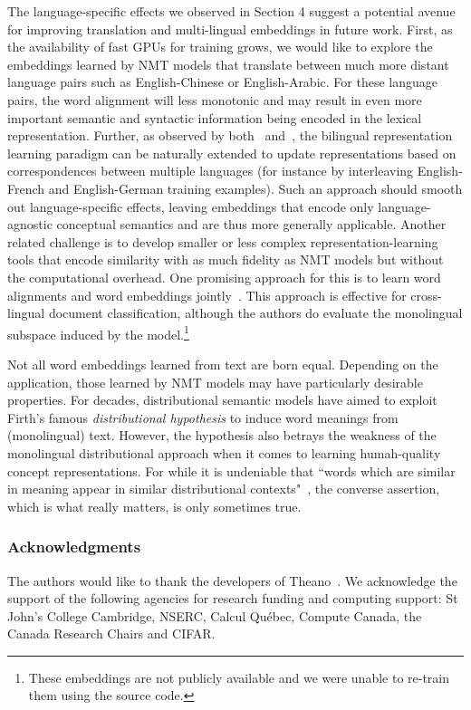 \documentclass{article} %
\begin{document}
The language-specific effects we observed in Section 4 suggest a potential avenue for improving translation and multi-lingual embeddings in future work. First, as the availability of fast GPUs for training grows, we would like to explore the embeddings learned by NMT models that translate between much more distant language pairs such as English-Chinese or English-Arabic. For these language pairs, the word alignment will less monotonic and may result in even more important semantic and syntactic information being encoded in the lexical representation. Further,  as observed by both~\cite{Hermann:2014:ICLR} and~\cite{faruqui2014improving}, the bilingual representation learning paradigm can be naturally extended to update representations based on correspondences between multiple languages (for instance by interleaving English-French and English-German training examples). Such an approach should smooth out language-specific effects, leaving embeddings that encode only language-agnostic conceptual semantics and are thus more generally applicable. Another related challenge is to develop smaller or less complex representation-learning tools that encode similarity with as much fidelity as NMT models but without the computational overhead. One promising approach for this is to learn word alignments and word embeddings jointly~\citep{Kocisky:2014}. This approach is effective for cross-lingual document classification, although the authors do evaluate the monolingual subspace induced by the model.\footnote{These embeddings are not publicly available and we were unable to re-train them using the source code.}

Not all word embeddings learned from text are born equal. Depending on the application, those learned by NMT models may have particularly desirable properties. For decades, distributional semantic models have aimed to exploit Firth's famous \emph{distributional hypothesis} to induce word meanings from (monolingual) text. However, the hypothesis also betrays the weakness of the monolingual distributional approach when it comes to learning humah-quality concept representations. For while it is undeniable that ``words which are similar in meaning appear in similar distributional contexts"~\citep{dist}, the converse assertion, which is what really matters, is only sometimes true. 





\subsubsection*{Acknowledgments}
The authors would like to thank the developers of
Theano~\cite{bergstra+al:2010-scipy,Bastien-Theano-2012}.  We acknowledge the
support of the following agencies for research funding and computing support:
St John's College Cambridge, NSERC, Calcul Qu\'{e}bec, Compute Canada, the Canada Research Chairs and CIFAR.




\end{document}
